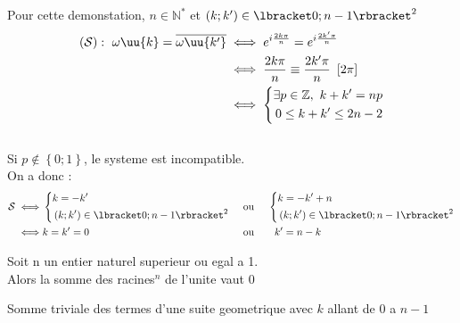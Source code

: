 \documentclass[12pt,a4paper]{article}
\begin{document}
			\begin{preuve}
				Pour cette demonstation, $n\in\mathbb{N}^*$ et $\left(k;k'\right)\in\lbracket0;n-1\rbracket^2$ \\
				$$\begin{aligned}
					\left(\mathcal{S}\right):\ \omega\uu{k}=\overline{\omega\uu{k'}}&\iff e^{i\frac{2k\pi}{n}}=e^{i\frac{2k'\pi}{n}} \\
					&\iff\frac{2k\pi}{n}\equiv\frac{2k'\pi}{n}\ \left[2\pi\right] \\
					&\iff\left\{\begin{aligned}
						\exists p\in\mathbb{Z},\ k+k'=np\\
						0\leq k+k'\leq2n-2
					\end{aligned}\right.
				\end{aligned}$$ \\
				Si $p\notin\left\{0;1\right\}$, le systeme est incompatible. \\
				On a donc :
				$$\begin{aligned}
					\mathcal{S}\iff&\left\{\begin{aligned}
						&k=-k'\\
						&\left(k;k'\right)\in\lbracket0;n-1\rbracket^2
					\end{aligned}\right.
					&&\text{  ou  }
					&&\left\{\begin{aligned}
						&k=-k'+n\\
						&\left(k;k'\right)\in\lbracket0;n-1\rbracket^2
					\end{aligned}\right. \\
					\iff &k=k'=0
					&&\text{  ou  }
					&&\ \ k'=n-k
				\end{aligned}$$
			\end{preuve}
			\begin{prop}
				Soit n un entier naturel superieur ou egal a 1. \\
				Alors la somme des racines$^n$ de l'unite vaut 0
			\end{prop}
			\begin{preuve}
				Somme triviale des termes d'une suite geometrique avec $k$ allant de $0$ a $n-1$
			\end{preuve}
\end{document}
